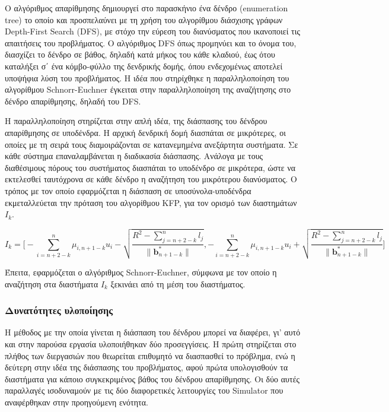 Ο αλγόριθμος απαρίθμησης δημιουργεί στο παρασκήνιο ένα δένδρο (\mbox{enumeration} tree) το οποίο και προσπελαύνει με τη χρήση του αλγορίθμου διάσχισης γράφων Depth-First Search (DFS), με στόχο την εύρεση του διανύσματος που ικανοποιεί τις απαιτήσεις του προβλήματος. Ο αλγόριθμος DFS όπως προμηνύει και το όνομα του, διασχίζει το δένδρο σε βάθος, δηλαδή κατά μήκος του κάθε κλαδιού, έως ότου καταλήξει σ΄ ένα κόμβο-φύλλο της δενδρικής δομής, όπου ενδεχομένως αποτελεί υποψήφια λύση του προβλήματος. Η ιδέα που στηρίχθηκε η παραλληλοποίηση του αλγορίθμου Schnorr-Euchner έγκειται στην παραλληλοποίηση της αναζήτησης στο δένδρο απαρίθμησης, δηλαδή του DFS. 
 

Η παραλληλοποίηση στηρίζεται στην απλή ιδέα, της διάσπασης του δένδρου απαρίθμησης σε υποδένδρα. Η αρχική δενδρική δομή διασπάται σε μικρότερες, οι οποίες με τη σειρά τους διαμοιράζονται σε κατανεμημένα ανεξάρτητα συστήματα. Σε κάθε σύστημα επαναλαμβάνεται η διαδικασία διάσπασης. Ανάλογα με τους διαθέσιμους πόρους του συστήματος διασπάται το υποδένδρο σε μικρότερα, ώστε να εκτελεσθεί ταυτόχρονα σε κάθε δένδρο η αναζήτηση του μικρότερου διανύσματος. Ο τρόπος με τον οποίο εφαρμόζεται η διάσπαση σε υποσύνολα-υποδένδρα εκμεταλλεύεται την πρόταση του αλγορίθμου KFP, για τον ορισμό των διαστημάτων $ I_k $. 
 
$$ I_k = \Bigg[- \sum_{i=n+2-k}^n μ_{i,n+1-k} u_i - \sqrt{\frac{R^2 - \sum_{j=n+2-k}^n l_j}{\| \bm b_{n+1-k}^* \|}}, 
- \sum_{i=n+2-k}^n μ_{i,n+1-k} u_i + \sqrt{\frac{R^2 - \sum_{j=n+2-k}^n l_j}{\| \bm b_{n+1-k}^* \|}} \Bigg] $$
 
Έπειτα, εφαρμόζεται ο αλγόριθμος Schnorr-Euchner, σύμφωνα με τον οποίο η αναζήτηση στα διαστήματα $I_k$ ξεκινάει από τη μέση του διαστήματος. 

\subsubsection{Δυνατότητες υλοποίησης}

Η μέθοδος με την οποία γίνεται η διάσπαση του δένδρου μπορεί να διαφέρει, γι' αυτό και στην παρούσα εργασία υλοποιήθηκαν δύο προσεγγίσεις. Η πρώτη στηρίζεται στο πλήθος των διεργασιών που θεωρείται επιθυμητό να διασπασθεί το πρόβλημα, ενώ η δεύτερη στην ιδέα της διάσπασης του προβλήματος, αφού πρώτα υπολογισθούν τα διαστήματα για κάποιο συγκεκριμένος βάθος του δένδρου απαρίθμησης. Οι δύο αυτές παραλλαγές ισοδυναμούν με τις δύο διαφορετικές λειτουργίες του Simulator που αναφέρθηκαν στην προηγούμενη ενότητα. 

